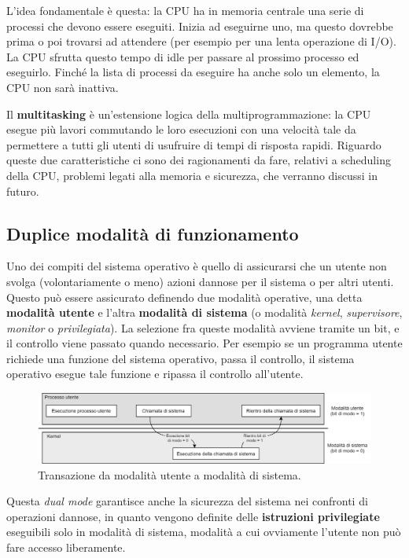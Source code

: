         L'idea fondamentale è questa: la CPU ha in memoria centrale una serie di processi che devono essere eseguiti. Inizia ad eseguirne uno, ma questo dovrebbe prima o poi trovarsi ad attendere (per esempio per una lenta operazione di I/O). La CPU sfrutta questo tempo di idle per passare al prossimo processo ed eseguirlo. Finché la lista di processi da eseguire ha anche solo un elemento, la CPU non sarà inattiva.
            
        Il \textbf{multitasking} è un'estensione logica della multiprogrammazione: la CPU esegue più lavori commutando le loro esecuzioni con una velocità tale da permettere a tutti gli utenti di usufruire di tempi di risposta rapidi. Riguardo queste due caratteristiche ci sono dei ragionamenti da fare, relativi a scheduling della CPU, problemi legati alla memoria e sicurezza, che verranno discussi in futuro.
                
    \subsection{Duplice modalità di funzionamento}
        Uno dei compiti del sistema operativo è quello di assicurarsi che un utente non svolga (volontariamente o meno) azioni dannose per il sistema o per altri utenti. Questo può essere assicurato definendo due modalità operative, una detta \textbf{modalità utente} e l'altra \textbf{modalità di sistema} (o modalità \textit{kernel}, \textit{supervisore}, \textit{monitor} o \textit{privilegiata}). La selezione fra queste modalità avviene tramite un bit, e il controllo viene passato quando necessario. Per esempio se un programma utente richiede una funzione del sistema operativo, passa il controllo, il sistema operativo esegue tale funzione e ripassa il controllo all'utente.
                
        \begin{figure}[h]
            \centering
            \includegraphics[width=1\textwidth]{img/img4.png}
            \caption{Transazione da modalità utente a modalità di sistema.}
            \label{fig:img4}
        \end{figure}
                
        Questa \textit{dual mode} garantisce anche la sicurezza del sistema nei confronti di operazioni dannose, in quanto vengono definite delle \textbf{istruzioni privilegiate} eseguibili solo in modalità di sistema, modalità a cui ovviamente l'utente non può fare accesso liberamente.
                
